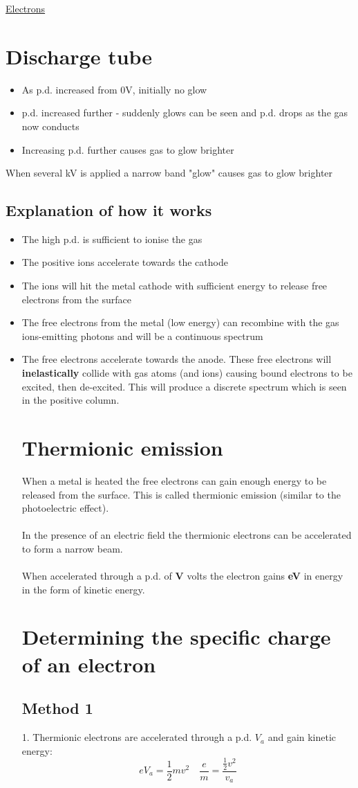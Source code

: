 \documentclass[12pt]{article}
\begin{document}
\begin{center}
\underline{\huge Electrons}
\end{center}
\section{Discharge tube}
\begin{itemize}
\item As p.d. increased from 0V, initially no glow
\item p.d. increased further - suddenly glows can be seen and p.d. drops as the gas now conducts
\item Increasing p.d. further causes gas to glow brighter
\end{itemize}
When several kV is applied a narrow band "glow" causes gas to glow brighter
\subsection{Explanation of how it works}
\begin{itemize}
\item The high p.d. is sufficient to ionise the gas
\item The positive ions accelerate towards the cathode
\item The ions will hit the metal cathode with sufficient energy to release free electrons from the surface
\item The free electrons from the metal (low energy) can recombine with the gas ions-emitting photons and will be a continuous spectrum
\item The free electrons accelerate towards the anode. These free electrons will \textbf{inelastically} collide with gas atoms (and ions) causing bound electrons to be excited, then de-excited. This will produce a discrete spectrum which is seen in the positive column.
\section{Thermionic emission}
When a metal is heated the free electrons can gain enough energy to be released from the surface. This is called thermionic emission (similar to the photoelectric effect).\\
\\
In the presence of an electric field the thermionic electrons can be accelerated to form a narrow beam.\\
\\
When accelerated through a p.d. of \textbf{V} volts the electron gains \textbf{eV} in energy in the form of kinetic energy.
\newpage
\section{Determining the specific charge of an electron}
\subsection{Method 1}
1. Thermionic electrons are accelerated through a p.d. $V_a$ and gain kinetic energy:\\
$$eV_a=\frac{1}{2}mv^2 \quad \frac{e}{m}=\frac{\frac{1}{2}v^2}{v_a}$$
\end{itemize}
\end{document}
